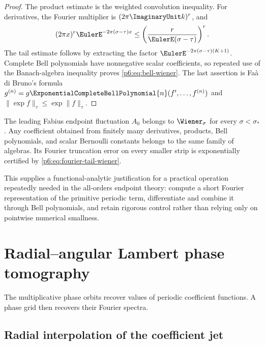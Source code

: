 \documentclass[11pt]{article}
\numberwithin{equation}{section}
\theoremstyle{definition}
\theoremstyle{remark}
\begin{document}
\begin{proof}
The product estimate is the weighted convolution inequality.  For derivatives, the
Fourier multiplier is $(2\pi\ImaginaryUnit k)^r$, and
\[
 (2\pi x)^r\EulerE^{-2\pi(\sigma-\tau)x}
 \le\left(\frac{r}{\EulerE(\sigma-\tau)}\right)^r.
\]
The tail estimate follows by extracting the factor
$\EulerE^{-2\pi(\sigma-\tau)(K+1)}$.  Complete Bell polynomials have nonnegative scalar
coefficients, so repeated use of the Banach-algebra inequality proves
\eqref{p6:eq:bell-wiener}.  The last assertion is Fa\`a di Bruno's formula
$g^{(n)}=g\ExponentialCompleteBellPolynomial{n}(f',\ldots,f^{(n)})$ and
$\|\exp f\|_\tau\le\exp\|f\|_\tau$.
\end{proof}

\begin{corollary}
\label{p6:cor:certified-bell}
The leading Fabius endpoint fluctuation $A_0$ belongs to $\Wiener_\sigma$ for every
$\sigma<\sigma_*$.  Any coefficient obtained from finitely many derivatives, products,
Bell polynomials, and scalar Bernoulli constants belongs to the same family of algebras.
Its Fourier truncation error on every smaller strip is exponentially certified by
\eqref{p6:eq:fourier-tail-wiener}.
\end{corollary}

This supplies a functional-analytic justification for a practical operation repeatedly
needed in the all-orders endpoint theory: compute a short Fourier representation of the
primitive periodic term, differentiate and combine it through Bell polynomials, and retain
rigorous control rather than relying only on pointwise numerical smallness.

\section{Radial--angular Lambert phase tomography}
\label{p6:sec:tomography}

The multiplicative phase orbits recover values of periodic coefficient functions.  A phase
grid then recovers their Fourier spectra.

\subsection{Radial interpolation of the coefficient jet}
\end{document}
